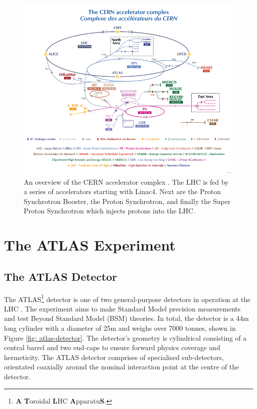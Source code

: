 \begin{figure}[htb!]
\includegraphics[width=\textwidth]{images/2-LHC-ATLAS/accelerator_complex.pdf}
\caption{An overview of the CERN accelerator complex \cite{CERN:2012:accelerators}. The \ac{LHC} is fed by a series of accelerators starting with Linac4. Next are the Proton Synchrotron Booster, the Proton Synchrotron, and finally the Super Proton Synchrotron which injects protons into the \ac{LHC}.}
\label{fig: accelerator-complex}
\end{figure}



\section{The ATLAS Experiment}
\label{atlas-section}

\subsection{The ATLAS Detector}
The ATLAS\footnote[1]{\textbf{A} \textbf{T}oroidal \textbf{L}HC \textbf{A}pparatu\textbf{S}.} detector is one of two general-purpose detectors in operation at the \ac{LHC} \cite{PERF-2007-01}. The experiment aims to make Standard Model precision measurements and test Beyond Standard Model (BSM) theories. In total, the detector is a 44m long cylinder with a diameter of 25m and weighs over 7000 tonnes, shown in Figure \ref{fig: atlas-detector}. The detector’s geometry is cylindrical consisting of a central barrel and two end-caps to ensure forward physics coverage and hermeticity. The ATLAS detector comprises of specialised sub-detectors, orientated coaxially around the nominal interaction point at the centre of the detector. 

